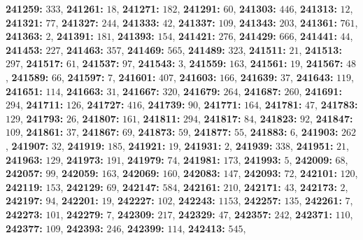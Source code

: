 \textsf{\bfseries 241259:} $333$, \textsf{\bfseries 241261:} $18$, \textsf{\bfseries 241271:} $182$, \textsf{\bfseries 241291:} $60$, \textsf{\bfseries 241303:} $446$, \textsf{\bfseries 241313:} $12$, \textsf{\bfseries 241321:} $77$, \textsf{\bfseries 241327:} $244$, \textsf{\bfseries 241333:} $42$, \textsf{\bfseries 241337:} $109$, \textsf{\bfseries 241343:} $203$, \textsf{\bfseries 241361:} $761$, \textsf{\bfseries 241363:} $2$, \textsf{\bfseries 241391:} $181$, \textsf{\bfseries 241393:} $154$, \textsf{\bfseries 241421:} $276$, \textsf{\bfseries 241429:} $666$, \textsf{\bfseries 241441:} $44$, \textsf{\bfseries 241453:} $227$, \textsf{\bfseries 241463:} $357$, \textsf{\bfseries 241469:} $565$, \textsf{\bfseries 241489:} $323$, \textsf{\bfseries 241511:} $21$, \textsf{\bfseries 241513:} $297$, \textsf{\bfseries 241517:} $61$, \textsf{\bfseries 241537:} $97$, \textsf{\bfseries 241543:} $3$, \textsf{\bfseries 241559:} $163$, \textsf{\bfseries 241561:} $19$, \textsf{\bfseries 241567:} $48$, \textsf{\bfseries 241589:} $66$, \textsf{\bfseries 241597:} $7$, \textsf{\bfseries 241601:} $407$, \textsf{\bfseries 241603:} $166$, \textsf{\bfseries 241639:} $37$, \textsf{\bfseries 241643:} $119$, \textsf{\bfseries 241651:} $114$, \textsf{\bfseries 241663:} $31$, \textsf{\bfseries 241667:} $320$, \textsf{\bfseries 241679:} $264$, \textsf{\bfseries 241687:} $260$, \textsf{\bfseries 241691:} $294$, \textsf{\bfseries 241711:} $126$, \textsf{\bfseries 241727:} $416$, \textsf{\bfseries 241739:} $90$, \textsf{\bfseries 241771:} $164$, \textsf{\bfseries 241781:} $47$, \textsf{\bfseries 241783:} $129$, \textsf{\bfseries 241793:} $26$, \textsf{\bfseries 241807:} $161$, \textsf{\bfseries 241811:} $294$, \textsf{\bfseries 241817:} $84$, \textsf{\bfseries 241823:} $92$, \textsf{\bfseries 241847:} $109$, \textsf{\bfseries 241861:} $37$, \textsf{\bfseries 241867:} $69$, \textsf{\bfseries 241873:} $59$, \textsf{\bfseries 241877:} $55$, \textsf{\bfseries 241883:} $6$, \textsf{\bfseries 241903:} $262$, \textsf{\bfseries 241907:} $32$, \textsf{\bfseries 241919:} $185$, \textsf{\bfseries 241921:} $19$, \textsf{\bfseries 241931:} $2$, \textsf{\bfseries 241939:} $338$, \textsf{\bfseries 241951:} $21$, \textsf{\bfseries 241963:} $129$, \textsf{\bfseries 241973:} $191$, \textsf{\bfseries 241979:} $74$, \textsf{\bfseries 241981:} $173$, \textsf{\bfseries 241993:} $5$, \textsf{\bfseries 242009:} $68$, \textsf{\bfseries 242057:} $99$, \textsf{\bfseries 242059:} $163$, \textsf{\bfseries 242069:} $160$, \textsf{\bfseries 242083:} $147$, \textsf{\bfseries 242093:} $72$, \textsf{\bfseries 242101:} $120$, \textsf{\bfseries 242119:} $153$, \textsf{\bfseries 242129:} $69$, \textsf{\bfseries 242147:} $584$, \textsf{\bfseries 242161:} $210$, \textsf{\bfseries 242171:} $43$, \textsf{\bfseries 242173:} $2$, \textsf{\bfseries 242197:} $94$, \textsf{\bfseries 242201:} $19$, \textsf{\bfseries 242227:} $102$, \textsf{\bfseries 242243:} $1153$, \textsf{\bfseries 242257:} $135$, \textsf{\bfseries 242261:} $7$, \textsf{\bfseries 242273:} $101$, \textsf{\bfseries 242279:} $7$, \textsf{\bfseries 242309:} $217$, \textsf{\bfseries 242329:} $47$, \textsf{\bfseries 242357:} $242$, \textsf{\bfseries 242371:} $110$, \textsf{\bfseries 242377:} $109$, \textsf{\bfseries 242393:} $246$, \textsf{\bfseries 242399:} $114$, \textsf{\bfseries 242413:} $545$, 
